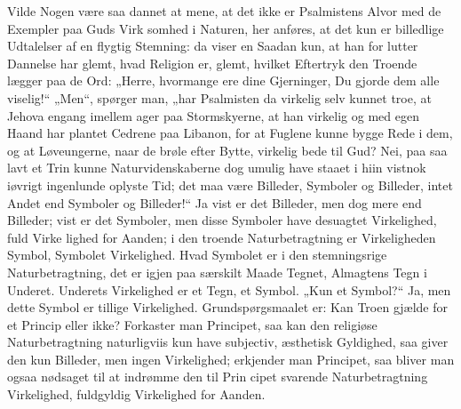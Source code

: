 \documentclass[12pt]{book}
\newcommand{\opage}[1]{\marginnote{\footnotesize\textit{[#1]}}}
\begin{document}
Vilde Nogen være saa dannet at mene, at det ikke
er Psalmistens Alvor med de Exempler paa Guds Virk\-%
somhed i Naturen, her anføres, at det kun er billedlige
Udtalelser af en flygtig Stemning: da viser en Saadan
kun, at han for lutter Dannelse har glemt, hvad Religion
er, glemt, hvilket Eftertryk den Troende lægger paa de
Ord: „Herre, hvormange ere dine Gjerninger, Du gjorde
dem alle viselig!“ „Men“, spørger man, „har Psalmisten
da virkelig selv kunnet troe, at Jehova engang imellem
ager paa Stormskyerne, at han virkelig og med egen
Haand har plantet Cedrene paa Libanon, for at Fuglene
kunne bygge Rede i dem, og at Løveungerne, naar de
brøle efter Bytte, virkelig bede til Gud? Nei, paa saa
lavt et Trin kunne Naturvidenskaberne dog umulig have
staaet i hiin vistnok iøvrigt ingenlunde oplyste Tid; det
maa være Billeder, Symboler og Billeder, intet Andet
end Symboler og Billeder!“ Ja vist er det Billeder,
men dog mere end Billeder; vist er det Symboler, men
disse Symboler have desuagtet Virkelighed, fuld Virke\-%
lighed for Aanden; i den troende Naturbetragtning er
Virkeligheden Symbol, Symbolet Virkelighed. Hvad
Symbolet er i den stemningsrige Naturbetragtning, det
er igjen paa særskilt Maade Tegnet, Almagtens Tegn i
Underet. Underets Virkelighed er et Tegn, et Symbol.
„Kun et Symbol?“ Ja, men dette Symbol er tillige
Virkelighed. Grundspørgsmaalet er: Kan Troen gjælde
for et Princip eller ikke? Forkaster man Principet, saa
kan den religiøse Naturbetragtning naturligviis kun have
subjectiv, æsthetisk Gyldighed, saa giver den kun Billeder,
men ingen Virkelighed; erkjender man Principet, saa
bliver man ogsaa nødsaget til at indrømme den til Prin\-%
\opage{170}\setcounter{footnote}{0}%
cipet svarende Naturbetragtning Virkelighed, fuldgyldig
Virkelighed for Aanden.
\end{document}
